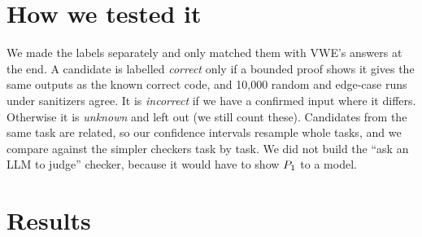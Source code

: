 \documentclass[10pt,a4paper]{article}
\begin{document}
\section{How we tested it}
\begin{center}
\end{center}
We made the labels separately and only matched them with VWE's answers at the end. A candidate is
labelled \emph{correct} only if a bounded proof shows it gives the same outputs as the known
correct code, and 10{,}000 random and edge-case runs under sanitizers agree. It is \emph{incorrect}
if we have a confirmed input where it differs. Otherwise it is \emph{unknown} and left out (we
still count these). Candidates from the same task are related, so our confidence intervals
resample whole tasks, and we compare against the simpler checkers task by task. We did not build
the ``ask an LLM to judge'' checker, because it would have to show $P_1$ to a model.

\section{Results}
\end{document}
